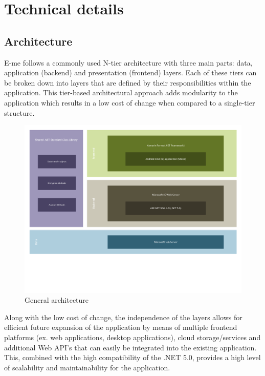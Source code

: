\chapter{Technical details}\label{ch:IMPLEMENTATION}

\section{Architecture}

E-me follows a commonly used N-tier architecture with three main parts: data, application (backend) and presentation (frontend) layers.
Each of these tiers can be broken down into layers that are defined by their responsibilities within the application.
This tier-based architectural approach adds modularity to the application which results in a low cost of change when compared to a single-tier structure.

\begin{figure}[H]
	\centering
	\includegraphics[scale=0.57]{general-architecture}
	\caption{General architecture}
\end{figure}

Along with the low cost of change, the independence of the layers allows for efficient future expansion of 
the application by means of multiple frontend platforms (ex. web applications, desktop applications), cloud storage/services and additional
Web API's that can easily be integrated into the existing application.
This, combined with the high compatibility of the .NET 5.0, provides a high level of scalability and maintainability for the application.

